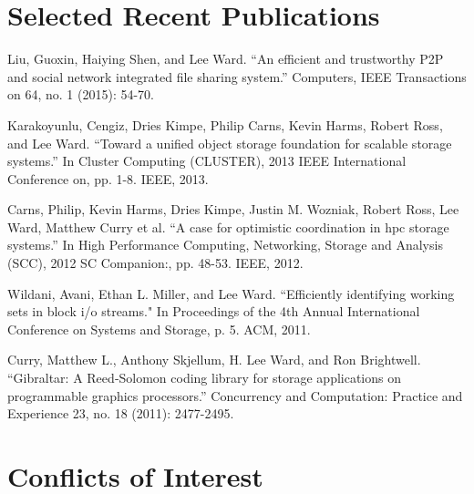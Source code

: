 \documentclass[11pt]{nsfcv}
\begin{document}
\section*{Selected Recent Publications}
\begin{publist}

\item
  Liu, Guoxin, Haiying Shen, and Lee Ward.
  ``An efficient and trustworthy P2P and social network integrated file sharing system.'' Computers, IEEE Transactions on 64, no. 1 (2015): 54-70.

\item
  Karakoyunlu, Cengiz, Dries Kimpe, Philip Carns, Kevin Harms, Robert Ross, and Lee Ward.
  ``Toward a unified object storage foundation for scalable storage systems.''
  In Cluster Computing (CLUSTER), 2013 IEEE International Conference on, pp. 1-8. IEEE, 2013.

\item
  Carns, Philip, Kevin Harms, Dries Kimpe, Justin M. Wozniak, Robert Ross, Lee Ward, Matthew Curry et al.
  ``A case for optimistic coordination in hpc storage systems.'' In High Performance Computing, Networking, Storage and Analysis (SCC), 2012 SC Companion:, pp. 48-53. IEEE, 2012.

\item
  Wildani, Avani, Ethan L. Miller, and Lee Ward.
  ``Efficiently identifying working sets in block i/o streams."
  In Proceedings of the 4th Annual International Conference on Systems and Storage, p. 5. ACM, 2011.

\item
  Curry, Matthew L., Anthony Skjellum, H. Lee Ward, and Ron Brightwell.
  ``Gibraltar: A Reed‐Solomon coding library for storage applications on programmable graphics processors.'' Concurrency and Computation: Practice and Experience 23, no. 18 (2011): 2477-2495.

\end{publist}

\newpage
\section*{Conflicts of Interest}
\end{document}

